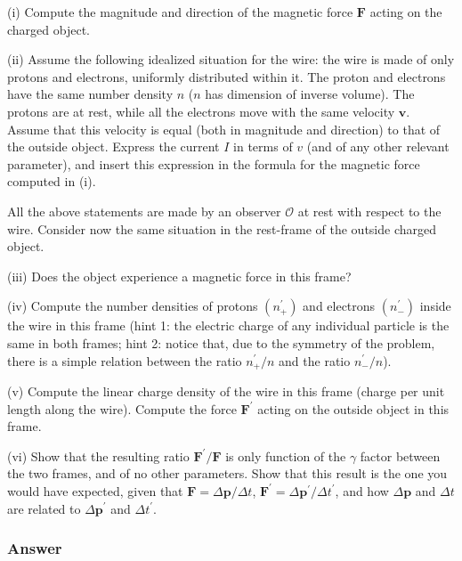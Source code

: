 (i) Compute the magnitude and direction of the magnetic force $\mathbf{F}$ acting on the charged object.

(ii) Assume the following idealized situation for the wire: the wire is made of only protons and electrons, uniformly distributed within it. The proton and electrons have the same number density $n$ ($n$ has dimension of inverse volume). The protons are at rest, while all the electrons move with the same velocity $\mathbf{v}$. Assume that this velocity is equal (both in magnitude and direction) to that of the outside object. Express the current $I$ in terms of $v$ (and of any other relevant parameter), and insert this expression in the formula for the magnetic force computed in (i).

All the above statements are made by an observer $\mathcal{O}$ at rest with respect to the wire. Consider now the same situation in the rest-frame of the outside charged object.

(iii) Does the object experience a magnetic force in this frame?

(iv) Compute the number densities of protons $(n_+^\prime)$ and electrons $(n_-^\prime)$ inside the wire in this frame (hint 1: the electric charge of any individual particle is the same in both frames; hint 2: notice that, due to the symmetry of the problem, there is a simple relation between the ratio $n_+^\prime/n$ and the ratio $n_-^\prime/n$).

(v) Compute the linear charge density of the wire in this frame (charge per unit length along the wire). Compute the force $\mathbf{F}^\prime$ acting on the outside object in this frame.

(vi) Show that the resulting ratio $\mathbf{F}^\prime/\mathbf{F}$ is only function of the $\gamma$ factor between the two frames, and of no other parameters. Show that this result is the one you would have expected, given that $\mathbf{F} = {\Delta}\mathbf{p}/{\Delta}t$, $\mathbf{F}^\prime= {\Delta}\mathbf{p}^\prime/{\Delta}t^\prime$, and how ${\Delta}\mathbf{p}$ and ${\Delta}t$ are related to ${\Delta}\mathbf{p}^\prime$ and ${\Delta}t^\prime$.	

\subsubsection{Answer}



